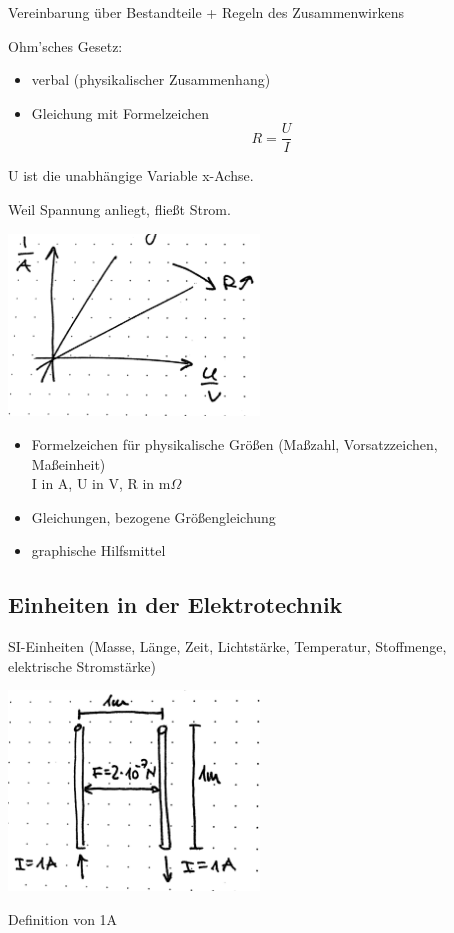 Vereinbarung über Bestandteile + Regeln des Zusammenwirkens

 Ohm'sches Gesetz:

\begin{itemize}
	\item verbal (physikalischer Zusammenhang)
	\item Gleichung mit Formelzeichen\\
		$$R = \frac{U}{I}$$
\end{itemize}

U ist die unabhängige Variable \ra x-Achse.

\glqq Weil Spannung anliegt, fließt Strom.\grqq

\begin{center}
\includegraphics[width=0.5\textwidth]{img/1_2}
\end{center}

\begin{itemize}
	\item Formelzeichen für physikalische Größen 
		(Maßzahl, Vorsatzzeichen, Maßeinheit)\\
		I in A, U in V, R in m$\Omega$
	\item Gleichungen, bezogene Größengleichung
	\item graphische Hilfsmittel
\end{itemize}

\subsection{Einheiten in der Elektrotechnik}

SI-Einheiten (Masse, Länge, Zeit, Lichtstärke, Temperatur, Stoffmenge, elektrische Stromstärke)

\begin{center}
\includegraphics[width=0.5\textwidth]{img/1_3}
\end{center}
Definition von 1A

